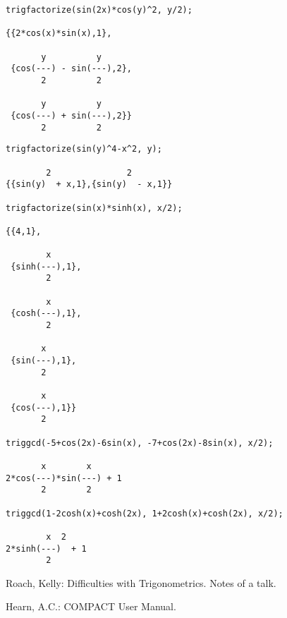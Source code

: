 \documentclass[11pt]{article}
\begin{document}
\begin{verbatim}
trigfactorize(sin(2x)*cos(y)^2, y/2);

{{2*cos(x)*sin(x),1},

       y          y
 {cos(---) - sin(---),2},
       2          2

       y          y
 {cos(---) + sin(---),2}}
       2          2
\end{verbatim}
\begin{verbatim}
trigfactorize(sin(y)^4-x^2, y);

        2               2
{{sin(y)  + x,1},{sin(y)  - x,1}}

trigfactorize(sin(x)*sinh(x), x/2);

{{4,1},

        x
 {sinh(---),1},
        2

        x
 {cosh(---),1},
        2

       x
 {sin(---),1},
       2

       x
 {cos(---),1}}
       2

triggcd(-5+cos(2x)-6sin(x), -7+cos(2x)-8sin(x), x/2);

       x        x
2*cos(---)*sin(---) + 1
       2        2

triggcd(1-2cosh(x)+cosh(2x), 1+2cosh(x)+cosh(2x), x/2);

        x  2
2*sinh(---)  + 1
        2
\end{verbatim}

\begin{thebibliography}{99}

Roach, Kelly: Difficulties with Trigonometrics. Notes of a talk.

Hearn, A.C.: COMPACT User Manual.

\end{thebibliography}
\end{document}
